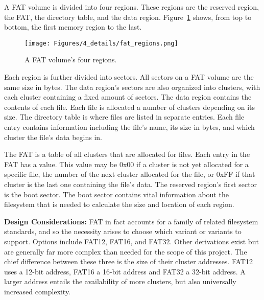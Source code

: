 
A FAT volume is divided into four regions. These regions are the reserved region, the FAT, the directory table, and the data region. Figure~\ref{fig:FAT_regions} shows, from top to bottom, the first memory region to the last.

\begin{figure}[H]
    \centering
    \texttt{[image: Figures/4\_details/fat\_regions.png]} 
    \caption{A FAT volume's four regions.}
    \label{fig:FAT_regions}
\end{figure}

Each region is further divided into sectors. All sectors on a FAT volume are the same size in bytes. The data region's sectors are also organized into clusters, with each cluster containing a fixed amount of sectors. The data region contains the contents of each file. Each file is allocated a number of clusters depending on its size. The directory table is where files are listed in separate entries. Each file entry contains information including the file's name, its size in bytes, and which cluster the file's data begins in. 

The FAT is a table of all clusters that are allocated for files. Each entry in the FAT has a value. This value may be 0x00 if a cluster is not yet allocated for a specific file, the number of the next cluster allocated for the file, or 0xFF if that cluster is the last one containing the file's data. The reserved region's first sector is the boot sector. The boot sector contains vital information about the filesystem that is needed to calculate the size and location of each region.




\textbf{Design Considerations:} FAT in fact accounts for a family of related filesystem standards, and so the necessity arises to choose which variant or variants to support. Options include FAT12, FAT16, and FAT32. Other derivations exist but are generally far more complex than needed for the scope of this project.
The chief difference between these three is the size of their cluster addresses. FAT12 uses a 12-bit address, FAT16 a 16-bit address and FAT32 a 32-bit address. A larger address entails the availability of more clusters, but also universally increased complexity.
\par

